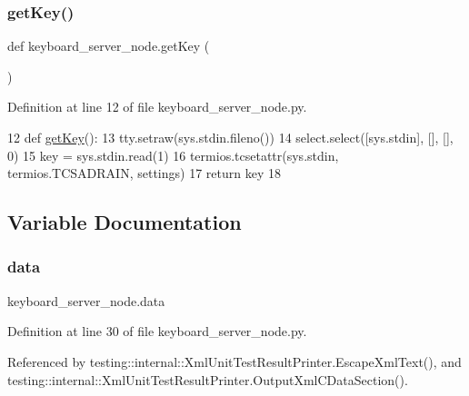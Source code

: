 \subsubsection{\texorpdfstring{get\+Key()}{getKey()}}
{\footnotesize\ttfamily def keyboard\+\_\+server\+\_\+node.\+get\+Key (\begin{DoxyParamCaption}{ }\end{DoxyParamCaption})}



Definition at line 12 of file keyboard\+\_\+server\+\_\+node.\+py.


\begin{DoxyCode}
12 \textcolor{keyword}{def }\hyperlink{namespacekeyboard__server__node_abe4dc127c8bdf79333dfa931e556f6f7}{getKey}():
13     tty.setraw(sys.stdin.fileno())
14     select.select([sys.stdin], [], [], 0)
15     key = sys.stdin.read(1)
16     termios.tcsetattr(sys.stdin, termios.TCSADRAIN, settings)
17     \textcolor{keywordflow}{return} key
18 
\end{DoxyCode}


\subsection{Variable Documentation}
\mbox{\label{namespacekeyboard__server__node_abfec01745fb17e2aa813913bea03d707}} 
\subsubsection{\texorpdfstring{data}{data}}
{\footnotesize\ttfamily keyboard\+\_\+server\+\_\+node.\+data}



Definition at line 30 of file keyboard\+\_\+server\+\_\+node.\+py.



Referenced by testing\+::internal\+::\+Xml\+Unit\+Test\+Result\+Printer.\+Escape\+Xml\+Text(), and testing\+::internal\+::\+Xml\+Unit\+Test\+Result\+Printer.\+Output\+Xml\+C\+Data\+Section().

\mbox{\label{namespacekeyboard__server__node_af0ebd8a9e1564ddc13a227c727602466}} 
